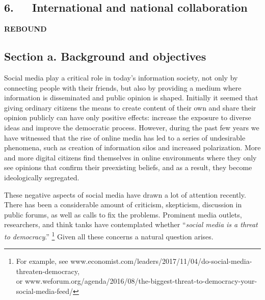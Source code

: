 \documentclass[a4paper,11pt]{article}
\begin{document}
\subsection*{6.~~~International and national collaboration}



\newpage
\begin{center}

{\LARGE\bf REBOUND} %
\end{center}


\subsection*{Section a. Background and objectives}

Social media play a critical role in today's information society, 
not only by connecting people with their friends, 
but also by providing a medium where information is disseminated and public opinion is shaped.
Initially it seemed that giving ordinary citizens the means to create content of their own
and share their opinion publicly 
can have only positive effects: increase the exposure to diverse ideas
and improve the democratic process.
However, during the past few years we have witnessed that
the rise of online media has led to 
a series of undesirable phenomena, 
such as creation of information silos and increased polarization.
More and more digital citizens find themselves in online environments
where they only see opinions that confirm their preexisting beliefs,
and as a result, they become ideologically segregated.

\smallskip
These negative aspects of social media have drawn a lot of attention recently.
There has been a considerable amount of criticism, skepticism, 
discussion in public forums, as well as calls %
to fix the problems. 
Prominent media outlets, researchers, and think tanks have contemplated whether 
``{\em social media is a threat to democracy}.''%
\footnote{For example, see www.economist.com/leaders/2017/11/04/do-social-media-threaten-democracy,\\
or www.weforum.org/agenda/2016/08/the-biggest-threat-to-democracy-your-social-media-feed/}
Given all these concerns a natural question arises.
\end{document}
